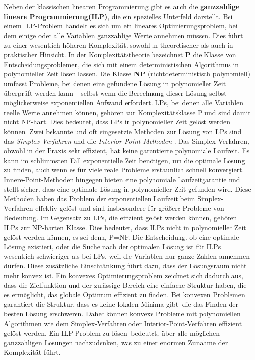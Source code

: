 \documentclass[bachelor, german]{algothesis}
\begin{document}
Neben der klassischen linearen Programmierung gibt es auch die \textbf{ganzzahlige lineare Programmierung(ILP)}, die ein spezielles Unterfeld darstellt. Bei einem ILP-Problem handelt es sich um ein lineares Optimierungsproblem, bei dem einige oder alle Variablen ganzzahlige Werte annehmen müssen. Dies führt zu einer wesentlich höheren Komplexität, sowohl in theoretischer als auch in praktischer Hinsicht.\newline
In der Komplexitätstheorie bezeichnet \textbf{P}  die Klasse von Entscheidungsproblemen, die sich mit einem deterministischen Algorithmus in polynomieller Zeit lösen lassen. Die Klasse \textbf{NP} (nichtdeterministisch polynomiell) umfasst Probleme, bei denen eine gefundene Lösung in polynomieller Zeit überprüft werden kann – selbst wenn die Berechnung dieser Lösung selbst möglicherweise exponentiellen Aufwand erfordert.\newline
LPs, bei denen alle Variablen reelle Werte annehmen können, gehören zur Komplexitätsklasse P und sind damit nicht NP-hart. Dies bedeutet, dass LPs in polynomieller Zeit gelöst werden können. Zwei bekannte und oft eingesetzte Methoden zur Lösung von LPs sind das \emph{Simplex-Verfahren} und die \emph{Interior-Point-Methoden} \cite{LinearProg}.  Das Simplex-Verfahren, obwohl in der Praxis sehr effizient, hat keine garantierte polynomiale Laufzeit. Es kann im schlimmsten Fall exponentielle Zeit benötigen, um die optimale Lösung zu finden, auch wenn es für viele reale Probleme erstaunlich schnell konvergiert. Innere-Point-Methoden hingegen bieten eine polynomiale Laufzeitgarantie und stellt sicher, dass eine optimale Lösung in polynomieller Zeit gefunden wird. Diese Methoden haben das Problem der exponentiellen Laufzeit beim Simplex-Verfahren effektiv gelöst und sind insbesondere für größere Probleme von Bedeutung.\newline
Im Gegensatz zu LPs, die effizient gelöst werden können, gehören ILPs zur NP-harten Klasse. Dies bedeutet, dass ILPs nicht in polynomieller Zeit gelöst werden können, es sei denn, P=NP. Die Entscheidung, ob eine optimale Lösung existiert, oder die Suche nach der optimalen Lösung ist für ILPs wesentlich schwieriger als bei LPs, weil die Variablen nur ganze Zahlen annehmen dürfen. Diese zusätzliche Einschränkung führt dazu, dass der Lösungsraum nicht mehr konvex ist. Ein konvexes Optimierungsproblem zeichnet sich dadurch aus, dass die Zielfunktion und der zulässige Bereich eine einfache Struktur haben, die es ermöglicht, das globale Optimum effizient zu finden. Bei konvexen Problemen garantiert die Struktur, dass es keine lokalen Minima gibt, die das Finden der besten Lösung erschweren. Daher können konvexe Probleme mit polynomiellen Algorithmen wie dem Simplex-Verfahren oder Interior-Point-Verfahren effizient gelöst werden. Ein ILP-Problem zu lösen, bedeutet, über alle möglichen ganzzahligen Lösungen nachzudenken, was zu einer enormen Zunahme der Komplexität führt.\newline
\end{document}
